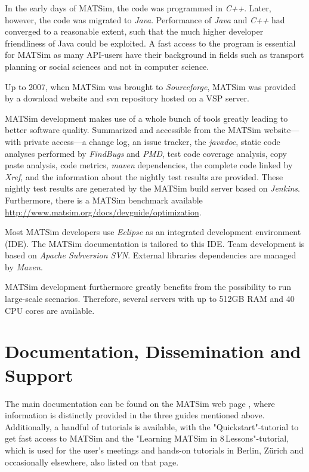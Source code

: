 In the early days of MATSim, the code was programmed in \emph{C++}. Later, however, the code was migrated to \emph{Java}. Performance of \emph{Java} and \emph{C++} had converged to a reasonable extent, such that the much higher developer friendliness of Java could be exploited. A fast access to the program is essential for MATSim as many API-users have their background in fields such as transport planning or social sciences and not in computer science. 

Up to 2007, when MATSim was brought to \emph{Sourceforge}, MATSim was provided by a download website and svn repository hosted on a VSP server.

MATSim development makes use of a whole bunch of tools greatly leading to better software quality. Summarized and accessible from the MATSim website---with private access---a change log, an issue tracker, the \emph{javadoc}, static code analyses performed by \emph{FindBugs} and \emph{PMD}, test code coverage analysis, copy paste analysis, code metrics, \emph{maven} dependencies, the complete code linked by \emph{Xref}, and the information about the nightly test results are provided. These nightly test results are generated by the MATSim build server based on \emph{Jenkins}. Furthermore, there is a MATSim benchmark available \url{http://www.matsim.org/docs/devguide/optimization}.

Most MATSim developers use \emph{Eclipse} as an integrated development environment (IDE). The MATSim documentation is tailored to this IDE. Team development is based on \emph{Apache Subversion SVN}. External libraries dependencies are managed by \emph{Maven}. 

MATSim development furthermore greatly benefits from the possibility to run large-scale scenarios. Therefore, several servers with up to 512GB RAM and 40 CPU cores are available.  

\section{Documentation, Dissemination and Support}
The main documentation can be found on the MATSim web page \citep[][]{MATSIM-T-Docu_Webpage_2014}, where information is distinctly provided in the three guides mentioned above. Additionally, a handful of tutorials is available, with the "Quickstart"-tutorial to get fast access to MATSim and the "Learning MATSim in 8\,Lessons"-tutorial, which is used for the user's meetings and hands-on tutorials in Berlin, Zürich and occasionally elsewhere, also listed on that page. 

